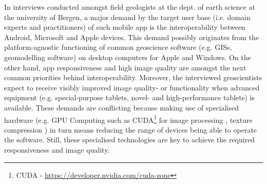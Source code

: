 \documentclass[review]{elsarticle}
\begin{document}
In interviews conducted amongst field geologists at the dept. of earth science at the university of Bergen, a major demand by the target user base (i.e. domain experts and practitioners) of such mobile app is the interoperability between Android, Microsoft and Apple devices. This demand possibly originates from the platform-agnostic functioning of common geoscience software (e.g. \glspl{GIS}, geomodelling software) on desktop computers for Apple and Windows. On the other hand, app responsiveness and high image quality are amongst the next common priorities behind interoperability. Moreover, the interviewed geoscientists expect to receive visibly improved image quality- or functionality when advanced equipment (e.g. special-purpose tablets, novel- and high-performance tablets) is available. These demands are conflicting because making use of specialised hardware (e.g. \gls{GPU} Computing such as CUDA\footnote{CUDA - \url{https://developer.nvidia.com/cuda-zone}} for image processing \cite{Heymann2007,Hudelist2014}, texture compression \cite{Chait2015}) in turn means reducing the range of devices being able to operate the software. Still, these specialised technologies are key to achieve the required responsiveness and image quality.

\end{document}
